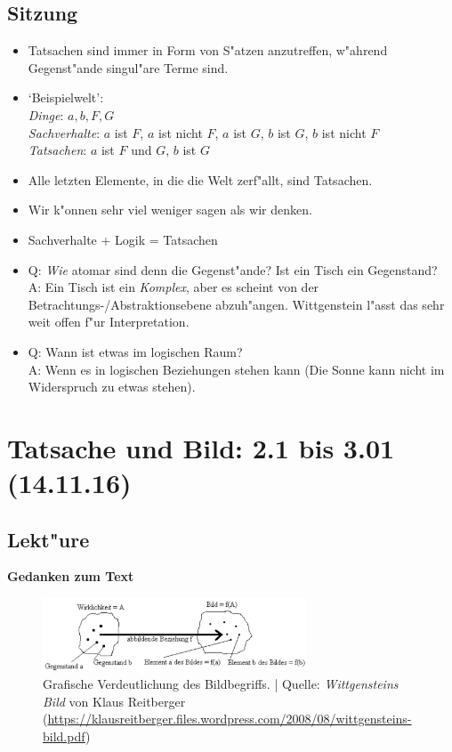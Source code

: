 \documentclass[]{scrartcl}
\begin{document}
\subsection{Sitzung}

\begin{itemize}
  \item Tatsachen sind immer in Form von S"atzen anzutreffen, w"ahrend Gegenst"ande singul"are Terme sind. 
  \item `Beispielwelt':\\\emph{Dinge}: $a, b, F, G$\\\emph{Sachverhalte}: $a$ ist $F$, $a$ ist nicht $F$,  $a$ ist $G$, $b$ ist $G$, $b$ ist nicht $F$\\\emph{Tatsachen}:  $a$ ist $F$ und $G$, $b$ ist $G$
  \item Alle letzten Elemente, in die die Welt zerf"allt, sind Tatsachen.
  \item Wir k"onnen sehr viel weniger sagen als wir denken.
  \item Sachverhalte + Logik = Tatsachen
  \item Q: \emph{Wie} atomar sind denn die Gegenst"ande? Ist ein Tisch ein Gegenstand?\\A: Ein Tisch ist ein \emph{Komplex}, aber es scheint von der Betrachtungs-/Abstraktionsebene abzuh"angen. Wittgenstein l"asst das sehr weit offen f"ur Interpretation.
  \item Q: Wann ist etwas im logischen Raum?\\A: Wenn es in logischen Beziehungen stehen kann (Die Sonne kann nicht im Widerspruch zu etwas stehen).
\end{itemize}

\section{Tatsache und Bild: 2.1 bis 3.01\\(14.11.16)}


\subsection{Lekt"ure}
\textbf{Gedanken zum Text}

\begin{figure}[h]
	\centering
	\includegraphics[width=0.7\textwidth]{images/tractatus/bild}
	\caption{Grafische Verdeutlichung des Bildbegriffs. | Quelle: \emph{Wittgensteins Bild}
von Klaus Reitberger (\url{https://klausreitberger.files.wordpress.com/2008/08/wittgensteins-bild.pdf})}
	\label{fig:bild}
\end{figure}
\end{document}
